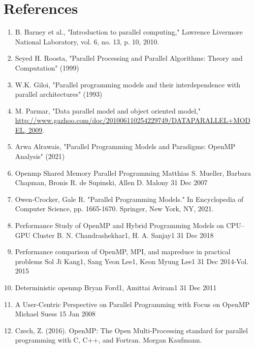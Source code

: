 \documentclass[12pt,conference]{IEEEtran}
\begin{document}
\section{References}
\begin{enumerate}
    \item B. Barney et al., "Introduction to parallel computing," Lawrence 
    Livermore National Laboratory, vol. 6, no. 13, p. 10, 2010.
    
    \item Seyed H. Roosta, "Parallel Processing and Parallel Algorithms: Theory and Computation" (1999)
    
    \item W.K. Giloi, "Parallel programming models and their interdependence with parallel architectures" (1993)
    
    \item M. Parmar, "Data parallel model and object oriented model," \url{http://www.gazhoo.com/doc/201006110254229749/DATAPARALLEL+MODEL, 2009}.
    
    \item Arwa Alrawais, "Parallel Programming Models and Paradigms: OpenMP Analysis" (2021)

    \item Openmp Shared Memory Parallel Programming
    Matthias S. Mueller, Barbara Chapman, Bronis R. de Supinski, Allen D. Malony  31 Dec 2007

    \item Owen-Crocker, Gale R. "Parallel Programming Models." In Encyclopedia of Computer Science, pp. 1665-1670. Springer, New York, NY, 2021.

    \item Performance Study of OpenMP and Hybrid Programming Models on CPU–GPU Cluster B. N. Chandrashekhar1, H. A. Sanjay1 31 Dec 2018

    \item Performance comparison of OpenMP, MPI, and mapreduce in practical problems Sol Ji Kang1, Sang Yeon Lee1, Keon Myung Lee1 31 Dec 2014-Vol. 2015

    \item Deterministic openmp Bryan Ford1, Amittai Aviram1 31 Dec 2011

    \item A User-Centric Perspective on Parallel Programming with Focus on OpenMP Michael Suess 15 Jan 2008

    \item Czech, Z. (2016). OpenMP: The Open Multi-Processing standard for parallel programming with C, C++, and Fortran. Morgan Kaufmann.


\end{enumerate}
\end{document}
